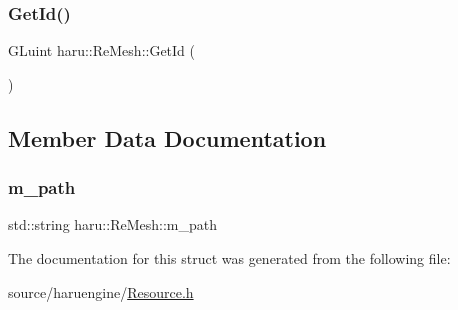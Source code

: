 \subsubsection{\texorpdfstring{Get\+Id()}{GetId()}}
{\footnotesize\ttfamily G\+Luint haru\+::\+Re\+Mesh\+::\+Get\+Id (\begin{DoxyParamCaption}{ }\end{DoxyParamCaption})}



\subsection{Member Data Documentation}
\mbox{\label{structharu_1_1_re_mesh_ae4a023863733f58bd9dabfde91f30f05}} 
\subsubsection{\texorpdfstring{m\+\_\+path}{m\_path}}
{\footnotesize\ttfamily std\+::string haru\+::\+Re\+Mesh\+::m\+\_\+path}



The documentation for this struct was generated from the following file\+:\begin{DoxyCompactItemize}
\item 
source/haruengine/\mbox{\hyperlink{_resource_8h}{Resource.\+h}}\end{DoxyCompactItemize}
